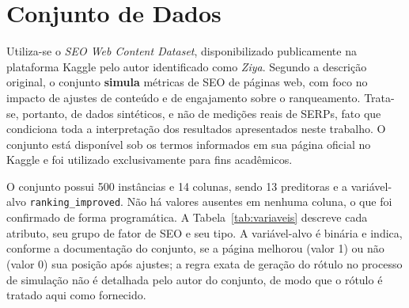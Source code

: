 \documentclass[12pt]{article}
\begin{document}
\section{Conjunto de Dados}
\label{sec:dados}

Utiliza-se o \textit{SEO Web Content Dataset}, disponibilizado publicamente na plataforma Kaggle
pelo autor identificado como \textit{Ziya}. Segundo a descrição original, o conjunto
\textbf{simula} métricas de SEO de páginas web, com foco no impacto de ajustes de conteúdo e de
engajamento sobre o ranqueamento. Trata-se, portanto, de dados sintéticos, e não de medições reais
de SERPs, fato que condiciona toda a interpretação dos resultados apresentados neste trabalho. O
conjunto está disponível sob os termos informados em sua página oficial no Kaggle e foi utilizado
exclusivamente para fins acadêmicos.

O conjunto possui 500 instâncias e 14 colunas, sendo 13 preditoras e a variável-alvo
\texttt{ranking\_improved}. Não há valores ausentes em nenhuma coluna, o que foi confirmado de
forma programática. A Tabela~\ref{tab:variaveis} descreve cada atributo, seu grupo de fator de SEO
e seu tipo. A variável-alvo é binária e indica, conforme a documentação do conjunto, se a página
melhorou (valor 1) ou não (valor 0) sua posição após ajustes; a regra exata de geração do rótulo
no processo de simulação não é detalhada pelo autor do conjunto, de modo que o rótulo é tratado
aqui como fornecido.
\end{document}
